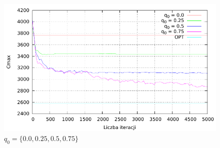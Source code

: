 \documentclass[10pt,a4paper]{article}
\begin{document}
\begin{figure}[h]
    \centering
    \includegraphics{./figures/inst01_rnd_qinit_smooth.pdf}
    \caption{$ q_0 = \{ 0.0, 0.25, 0.5, 0.75 \} $}
\end{figure}
\end{document}
